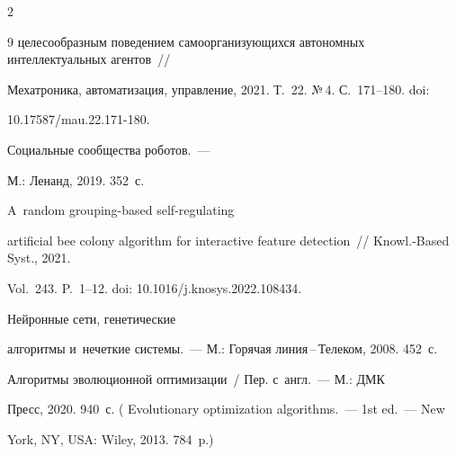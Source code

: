 \begin{multicols}{2}
{{\begin{thebibliography}{9}
целесообразным поведением са\-мо\-ор\-га\-ни\-зу\-ющих\-ся автономных интеллектуальных агентов~// 


Мехатроника, автоматизация, управ\-ле\-ние, 2021. Т.~22. №\,4. С.~171--180. doi: 


10.17587/mau.22.171-180.




   Социальные сообщества роботов.~--- 


М.: Ленанд, 2019. 352~с.




   A~random grouping-based self-regulating 


artificial bee colony algorithm for interactive feature detection~// Knowl.-Based Syst., 2021. 


Vol.~243. P.~1--12. doi: 10.1016/j.knosys.2022.108434.


  




   Нейронные сети, генетические 


алгоритмы и~нечеткие сис\-те\-мы.~--- М.: Горячая линия\,--\,Телеком, 2008. 452~с.







   Алгоритмы эволюционной оптимизации~/ Пер. с~англ.~--- М.: ДМК 


Пресс, 2020. 940~с. ( Evolutionary optimization algorithms.~--- 1st ed.~--- New 


York, NY, USA: Wiley, 2013. 784~p.)





\end{thebibliography}





 }


 }





\end{multicols}





\vspace*{-6pt}





